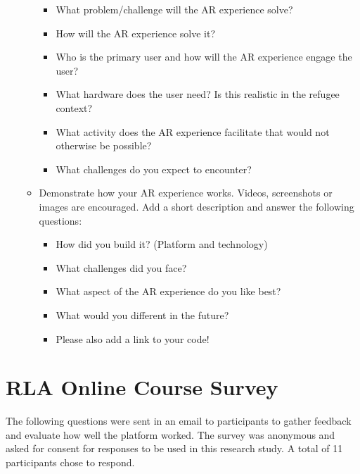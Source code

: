 \documentclass[12pt,twoside,vi]{mitthesis}
\begin{document}
\begin{enumerate}
\begin{itemize}
\begin{itemize}
\item What problem/challenge will the AR experience solve? 
\item How will the AR experience solve it? 
\item Who is the primary user and how will the AR experience engage the user?
\item What hardware does the user need? Is this realistic in the refugee context? 
\item What activity does the AR experience facilitate that would not otherwise be possible? 
\item What challenges do you expect to encounter? 
\end{itemize}
\item Demonstrate how your AR experience works. Videos, screenshots or images are encouraged. Add a short description and answer the following questions: 
\begin{itemize}
\item How did you build it? (Platform and technology)
\item What challenges did you face?
\item What aspect of the AR experience do you like best? 
\item What would you different in the future? 
\item Please also add a link to your code!
\end{itemize}
\end{itemize}
\end{enumerate}

\chapter{RLA Online Course Survey}

The following questions were sent in an email to participants to gather feedback and evaluate how well the platform worked. The survey was anonymous and asked for consent for responses to be used in this research study. A total of 11 participants chose to respond.
\end{document}
